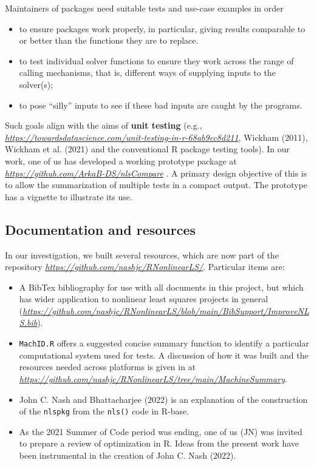 Maintainers of packages need suitable tests and use-case examples in order

\begin{itemize}
\tightlist
\item
  to ensure packages work properly, in particular, giving
  results comparable to or better than the functions they are to replace.
\item
  to test individual solver functions to ensure they work across the range of
  calling mechanisms, that is, different ways of supplying inputs to the solver(s);
\item
  to pose ``silly'' inputs to see if these bad inputs are caught by the programs.
\end{itemize}

Such goals align with the aims of \textbf{unit testing}
(e.g., \emph{\url{https://towardsdatascience.com/unit-testing-in-r-68ab9cc8d211}}, Wickham (2011), Wickham et al. (2021)
and the conventional R package testing tools).
In our work, one of us has developed a working prototype package at \emph{\url{https://github.com/ArkaB-DS/nlsCompare}} .
A primary design objective of this is to allow the summarization of multiple tests in
a compact output. The prototype has a vignette to illustrate its use.

\hypertarget{documentation-and-resources}{%
\subsection{Documentation and resources}\label{documentation-and-resources}}

In our investigation, we built several resources, which are now part of
the repository \emph{\url{https://github.com/nashjc/RNonlinearLS/}}. Particular items
are:

\begin{itemize}
\item
  A BibTex bibliography for use with all documents in this project, but which
  has wider application to nonlinear least squares projects in general
  (\emph{\url{https://github.com/nashjc/RNonlinearLS/blob/main/BibSupport/ImproveNLS.bib}}).
\item
  \texttt{MachID.R} offers a suggested concise summary function
  to identify a particular computational system used for tests. A discussion
  of how it was built and the resources needed across platforms is given in
  at \emph{\url{https://github.com/nashjc/RNonlinearLS/tree/main/MachineSummary}}.
\item
  John C. Nash and Bhattacharjee (2022) is an explanation of the construction of the \texttt{nlspkg} from the
  \texttt{nls()} code in R-base.
\item
  As the 2021 Summer of Code period was ending, one of us (JN) was invited to prepare
  a review of optimization in R. Ideas from the present work have been instrumental
  in the creation of John C. Nash (2022).
\end{itemize}

